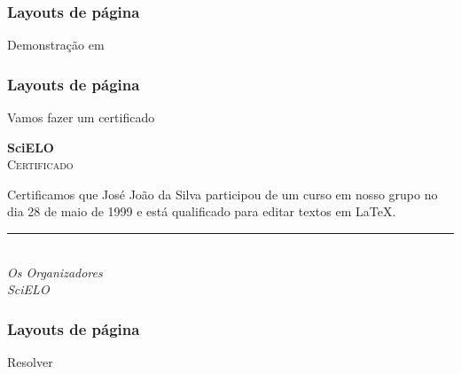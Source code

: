 \begin{frame}
  \frametitle{Layouts de página}
  \huge
  Demonstração em 
\end{frame}

\begin{frame}
  \frametitle{Layouts de página}
  \huge
  Vamos fazer um certificado
\end{frame}

\begin{frame}[plain]

  {\huge\textbf{SciELO}}\\[2em]
  {\LARGE\textsc{Certificado}}

  \noindent Certificamos que José João da Silva participou de um curso em nosso
  grupo no dia 28 de maio de 1999 e está qualificado para editar textos em
  \LaTeX.

  \vfill
  \rule{}{.4pt}\\
  \emph{Os Organizadores}\\
  \emph{SciELO}

\end{frame}

\begin{frame}
  \frametitle{Layouts de página}
  \huge
  Resolver 
\end{frame}
